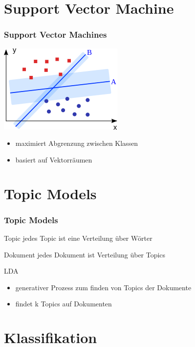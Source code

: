 \documentclass[12pt, xcolor=table]{beamer}
\begin{document}
\section{Support Vector Machine} %
\label{sec:SVM}

\begin{frame}
    \frametitle{Support Vector Machines}
    \begin{center}
    \includegraphics[scale=0.75]{figures/Svm_intro.png}
    \end{center}
    \begin{itemize}
        \item maximiert Abgrenzung zwischen Klassen
        \item basiert auf Vektorräumen
    \end{itemize}
\end{frame}

\section{Topic Models} %
\label{sec:LDA}

\begin{frame}
    \frametitle{Topic Models}
    \begin{block}{Topic}
        jedes Topic ist eine Verteilung über Wörter
    \end{block}
    \begin{block}{Dokument}
        jedes Dokument ist Verteilung über Topics
    \end{block}
    \begin{block}{LDA}
        \begin{itemize}
            \item generativer Prozess zum finden von Topics der Dokumente
            \item findet k Topics auf Dokumenten
        \end{itemize}
    \end{block}
\end{frame}
\section{Klassifikation} %
\label{sec:Klassifikation}
\end{document}
